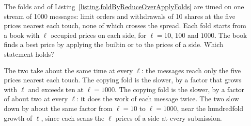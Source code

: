 \begin{question}
\label{question.copyingFoldAgainstInPlaceFold}
The folds  and 
of Listing~\ref{listing.foldByReduceOverApplyFolds}
are timed on one stream of 1000 messages:
limit orders and withdrawals of 10 shares at the five prices nearest each touch,
none of which crosses the spread.
Each fold starts from a book with $\ell$ occupied prices on each side,
for $\ell = 10$, $100$ and $1000$.
The book finds a best price by applying the builtin  or 
to the prices of a side.
Which statement holds?
\begin{choices}
 \choice The two take about the same time at every $\ell$:
  the messages reach only the five prices nearest each touch.
 \correctchoice The copying fold  is the slower,
  by a factor that grows with $\ell$ and exceeds ten at $\ell = 1000$.
 \choice The copying fold  is the slower,
  by a factor of about two at every $\ell$: it does the work of each message twice.
 \choice The two slow down by about the same factor from $\ell = 10$ to $\ell = 1000$,
  near the hundredfold growth of $\ell$,
  since each scans the $\ell$ prices of a side at every submission.
\end{choices}
\end{question}

